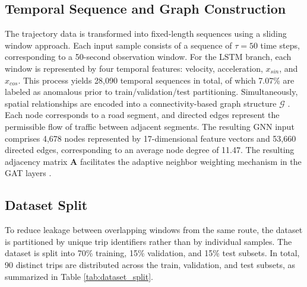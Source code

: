 \documentclass[journal]{IEEEtran}
\begin{document}
\subsection{Temporal Sequence and Graph Construction}
The trajectory data is transformed into fixed-length sequences using a sliding window approach. Each input sample consists of a sequence of $\tau = 50$ time steps, corresponding to a 50-second observation window. For the LSTM branch, each window is represented by four temporal features: velocity, acceleration, $x_{sin}$, and $x_{cos}$. This process yields 28,090 temporal sequences in total, of which 7.07\% are labeled as anomalous prior to train/validation/test partitioning. Simultaneously, spatial relationships are encoded into a connectivity-based graph structure $\mathcal{G}$ \cite{zhang_automatic_2022, park_graph_2025, nguyen_spatiotemporal_2026}. Each node corresponds to a road segment, and directed edges represent the permissible flow of traffic between adjacent segments. The resulting GNN input comprises 4,678 nodes represented by 17-dimensional feature vectors and 53,660 directed edges, corresponding to an average node degree of 11.47. The resulting adjacency matrix $\mathbf{A}$ facilitates the adaptive neighbor weighting mechanism in the GAT layers \cite{pan_dc-stgcn_2021, chang_stfdsgcn_2025}.

\subsection{Dataset Split}
\label{sec:dataset_split}
To reduce leakage between overlapping windows from the same route, the dataset is partitioned by unique trip identifiers rather than by individual samples. The dataset is split into 70\% training, 15\% validation, and 15\% test subsets. In total, 90 distinct trips are distributed across the train, validation, and test subsets, as summarized in Table \ref{tab:dataset_split}.

\begin{table}[!htbp]
  \centering
  \caption{Summary of dataset partitioning and anomaly distribution}
  \label{tab:dataset_split}
  \renewcommand{\arraystretch}{1.2}
\end{table}
\end{document}
